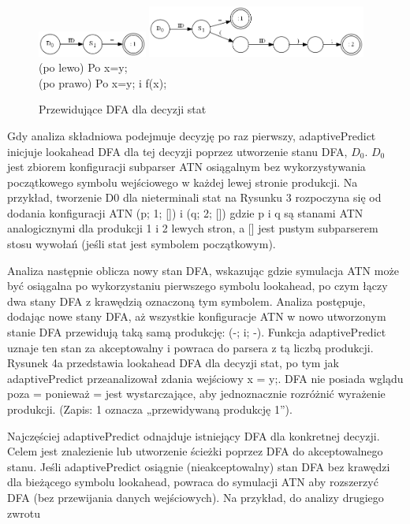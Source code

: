 \begin{figure}[h]
\includegraphics[width=0.32\textwidth]{Figure4a.png}
\includegraphics[width=0.64\textwidth]{Figure4b.png}
\\
(po lewo) Po x=y;\\
(po prawo) Po x=y; i f(x);
\caption{Przewidujące DFA dla decyzji stat}
\end{figure}
\par
Gdy analiza składniowa podejmuje decyzję po raz pierwszy, adaptivePredict
inicjuje lookahead DFA dla tej decyzji poprzez utworzenie stanu DFA, $D_0$.
$D_0$ jest zbiorem konfiguracji subparser ATN osiągalnym bez wykorzystywania
początkowego symbolu wejściowego w każdej lewej stronie produkcji.
Na przykład, tworzenie D0 dla nieterminali stat na Rysunku 3 rozpoczyna się
od dodania konfiguracji ATN (p; 1; []) i (q; 2; []) gdzie p i q są stanami
ATN analogicznymi dla produkcji 1 i 2 lewych stron, a [] jest pustym subparserem
stosu wywołań (jeśli stat jest symbolem początkowym).
\par
Analiza następnie oblicza nowy stan DFA, wskazując gdzie symulacja ATN może
być osiągalna po wykorzystaniu pierwszego symbolu lookahead, po czym łączy
dwa stany DFA z krawędzią oznaczoną tym symbolem. Analiza postępuje,
dodając nowe stany DFA, aż wszystkie konfiguracje ATN w nowo utworzonym
stanie DFA przewidują taką samą produkcję: (-; i; -).
Funkcja adaptivePredict uznaje ten stan za akceptowalny i powraca do parsera
z tą liczbą produkcji. Rysunek 4a przedstawia lookahead DFA dla decyzji stat,
po tym jak adaptivePredict przeanalizował zdania wejściowy x = y;.
DFA nie posiada wglądu poza = ponieważ = jest wystarczające, aby jednoznacznie
rozróżnić wyrażenie produkcji. (Zapis: 1 oznacza „przewidywaną produkcję 1”).
\par
Najczęściej adaptivePredict odnajduje istniejący DFA dla konkretnej decyzji.
Celem jest znalezienie lub utworzenie ścieżki poprzez DFA do akceptowalnego stanu.
Jeśli adaptivePredict osiągnie (nieakceptowalny) stan DFA bez krawędzi
dla bieżącego symbolu lookahead, powraca do symulacji ATN aby rozszerzyć DFA
(bez przewijania danych wejściowych). Na przykład, do analizy drugiego zwrotu
